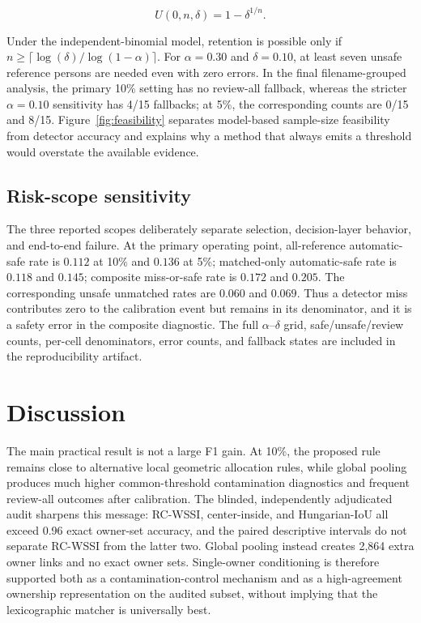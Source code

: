 \documentclass[iicol,pdflatex,sn-mathphys-num]{sn-jnl}
\begin{document}
\begin{equation}
U(0,n,\delta)=1-\delta^{1/n}.
\end{equation}

Under the independent-binomial model, retention is possible only if $n\geq\lceil\log(\delta)/\log(1-\alpha)\rceil$. For $\alpha=0.30$ and $\delta=0.10$, at least seven unsafe reference persons are needed even with zero errors. In the final filename-grouped analysis, the primary 10\% setting has no review-all fallback, whereas the stricter $\alpha=0.10$ sensitivity has 4/15 fallbacks; at 5\%, the corresponding counts are 0/15 and 8/15. Figure~\ref{fig:feasibility} separates model-based sample-size feasibility from detector accuracy and explains why a method that always emits a threshold would overstate the available evidence.

\subsection{Risk-scope sensitivity}

The three reported scopes deliberately separate selection, decision-layer behavior, and end-to-end failure. At the primary operating point, all-reference automatic-safe rate is $0.112$ at 10\% and $0.136$ at 5\%; matched-only automatic-safe rate is $0.118$ and $0.145$; composite miss-or-safe rate is $0.172$ and $0.205$. The corresponding unsafe unmatched rates are $0.060$ and $0.069$. Thus a detector miss contributes zero to the calibration event but remains in its denominator, and it is a safety error in the composite diagnostic. The full $\alpha$--$\delta$ grid, safe/unsafe/review counts, per-cell denominators, error counts, and fallback states are included in the reproducibility artifact.

\section{Discussion}\label{sec:discussion}

The main practical result is not a large F1 gain. At 10\%, the proposed rule remains close to alternative local geometric allocation rules, while global pooling produces much higher common-threshold contamination diagnostics and frequent review-all outcomes after calibration. The blinded, independently adjudicated audit sharpens this message: RC-WSSI, center-inside, and Hungarian-IoU all exceed 0.96 exact owner-set accuracy, and the paired descriptive intervals do not separate RC-WSSI from the latter two. Global pooling instead creates 2,864 extra owner links and no exact owner sets. Single-owner conditioning is therefore supported both as a contamination-control mechanism and as a high-agreement ownership representation on the audited subset, without implying that the lexicographic matcher is universally best.
\end{document}
